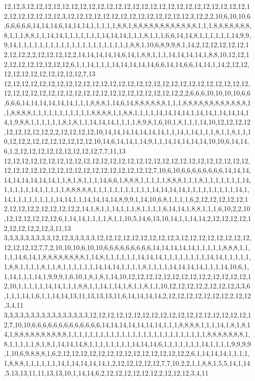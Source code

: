 12,12,3,12,12,12,12,12,12,12,12,12,12,12,12,12,12,12,12,12,12,12,12,12,12,12,12,12,12,12,12,12,12,12,12,3,12,12,12,12,12,12,12,12,12,12,12,12,12,12,3,12,2,2,10,6,10,10,6,6,6,6,6,6,14,14,14,6,14,14,14,1,1,1,1,1,8,8,1,8,8,8,8,8,8,8,8,8,8,8,8,1,1,1,8,8,8,8,8,8,8,8,1,1,1,8,8,1,1,14,14,1,1,1,1,1,1,1,14,14,14,1,1,1,8,1,1,1,6,6,14,14,8,1,1,1,1,1,1,14,9,9,9,14,1,1,1,1,1,1,1,1,1,1,1,1,1,1,1,1,1,1,1,1,1,8,8,1,10,6,8,9,9,8,1,14,2,12,12,12,12,12,12,12,12,2,2,12,12,12,12,2,14,14,14,14,14,6,14,1,8,8,1,1,1,14,14,14,14,1,8,8,10,12,12,12,12,12,12,12,12,12,12,6,1,1,14,1,1,1,14,14,14,14,14,6,6,14,14,6,6,14,14,1,14,2,12,12,12,12,12,12,12,12,12,12,12,7,13
12,12,12,12,12,12,12,12,12,12,12,12,12,12,12,12,12,12,12,12,12,12,12,12,12,12,12,12,12,12,12,12,12,12,12,12,12,12,12,12,12,12,12,12,12,12,12,12,2,2,6,6,6,10,10,10,10,6,6,6,6,6,14,14,14,14,14,14,1,1,1,8,8,8,1,14,6,14,8,8,8,8,8,8,1,1,1,8,8,8,8,8,8,8,8,8,8,8,8,1,1,8,8,8,8,1,1,1,1,1,1,1,1,1,1,1,8,8,8,8,1,1,8,8,1,1,1,1,14,14,14,14,1,14,14,1,14,14,14,14,1,9,8,8,1,1,1,1,1,1,8,1,8,1,1,14,14,14,1,1,1,1,8,9,8,1,6,10,1,8,1,1,1,14,10,12,12,12,12,12,12,12,12,12,2,2,12,12,12,12,10,14,14,14,14,14,14,14,1,1,14,1,14,1,1,1,8,1,1,8,1,1,10,12,12,2,12,12,12,12,12,12,12,10,14,6,14,14,1,14,9,1,1,14,14,14,14,14,10,10,6,14,14,6,1,2,12,12,12,12,12,12,12,12,12,7,7,11,13
12,12,12,12,12,12,12,12,12,12,12,12,12,12,12,12,12,12,12,12,12,12,12,12,12,12,12,12,12,12,12,12,12,12,12,12,12,12,12,12,12,12,12,12,12,7,10,6,10,6,6,6,6,6,6,6,6,14,14,14,14,14,14,14,14,14,1,1,8,1,8,1,1,1,14,6,6,1,8,8,8,1,1,1,1,1,8,8,8,1,1,1,8,1,1,1,1,1,1,1,14,1,1,1,1,1,14,1,1,1,1,1,8,8,8,8,8,1,1,1,1,1,1,1,1,1,1,1,14,14,14,14,1,1,1,1,1,1,1,1,1,14,1,14,1,1,1,1,1,1,1,1,14,14,1,1,14,14,14,14,8,9,9,1,14,10,6,8,1,1,1,1,6,2,12,12,12,12,12,12,12,12,12,2,12,12,12,12,2,14,1,8,1,1,14,1,1,1,8,1,1,1,1,6,14,14,1,8,8,1,1,1,6,10,2,2,10,12,12,12,12,12,12,6,1,14,14,1,1,1,1,8,1,1,10,5,14,6,13,10,14,1,1,14,14,2,12,12,12,12,12,12,12,12,2,12,3,11,13
3,3,3,3,3,3,3,3,3,12,12,3,3,3,3,3,12,12,12,12,12,12,12,12,12,3,12,12,12,12,12,12,12,12,12,12,12,12,7,7,2,10,10,10,6,10,10,6,6,6,6,6,6,6,6,6,14,14,14,14,14,1,1,1,1,1,8,8,8,1,1,1,1,14,6,14,1,8,8,8,8,8,8,8,8,1,14,8,1,1,1,1,1,1,14,14,14,1,1,1,1,1,1,1,1,14,14,1,1,1,1,1,1,8,8,1,1,1,1,8,1,1,8,1,1,1,1,1,1,14,14,14,1,1,1,1,8,1,1,1,1,14,14,14,14,1,1,1,14,10,6,1,1,14,1,1,1,14,1,9,9,9,1,6,10,1,8,1,8,1,14,10,12,12,12,12,12,12,12,12,12,2,12,12,12,12,12,10,1,1,1,1,1,14,14,1,1,1,8,8,1,1,14,1,14,1,8,1,1,8,1,1,10,12,12,12,12,2,12,12,12,3,3,6,1,1,1,14,1,6,1,1,14,14,13,11,13,13,13,11,6,14,14,14,14,2,12,12,12,12,12,12,12,2,12,12,3,4,11
3,3,3,3,3,3,3,3,3,3,3,3,3,3,3,3,12,12,12,12,12,12,12,12,12,12,12,12,12,12,12,12,12,12,12,7,10,10,6,6,6,6,6,6,6,6,6,6,6,6,6,14,14,14,14,14,14,14,1,1,1,8,8,8,8,1,1,1,14,1,8,1,8,14,1,8,8,8,8,8,8,8,8,8,8,1,1,1,1,1,1,1,1,1,1,1,1,1,1,1,1,1,1,1,1,1,1,1,1,1,1,8,8,8,8,8,8,8,1,8,1,1,1,1,1,8,1,8,1,14,14,14,8,1,1,1,1,1,1,1,1,14,14,14,6,1,1,1,1,1,1,1,14,1,1,1,1,9,9,9,9,1,10,6,9,8,8,8,1,6,2,12,12,12,12,12,12,12,12,12,12,12,12,12,12,2,6,1,14,14,14,1,1,1,1,1,8,8,8,1,1,1,1,1,1,14,1,14,14,14,14,1,2,12,12,12,12,12,7,7,10,2,2,1,1,8,8,1,5,5,14,1,14,5,13,13,11,11,13,13,10,1,14,14,6,2,12,12,12,12,12,12,2,12,12,12,3,4,11
